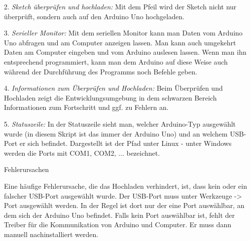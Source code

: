 2. \emph{Sketch überprüfen und hochladen:} Mit dem Pfeil wird der Sketch nicht nur überprüft, sondern auch auf den Arduino Uno hochgeladen.

3. \emph{Serieller Monitor:} Mit dem seriellen Monitor kann man Daten vom Arduino Uno abfragen und am Computer anzeigen lassen. Man kann auch umgekehrt Daten am Computer eingeben und vom Arduino auslesen lassen. Wenn man ihn entsprechend programmiert, kann man dem Arduino auf diese Weise auch während der Durchführung des Programms noch Befehle geben.

4. \emph{Informationen zum Überprüfen und Hochladen:} Beim Überprüfen und Hochladen zeigt die Entwicklungsumgebung in dem schwarzen Bereich Informationen zum Fortschritt und ggf. zu Fehlern an.

5. \emph{Statuszeile:} In der Statuszeile sieht man, welcher Arduino-Typ ausgewählt wurde (in diesem Skript ist das immer der Arduino Uno) und an welchem USB-Port er sich befindet. Dargestellt ist der Pfad unter Linux - unter Windows werden die Ports mit COM1, COM2, ... bezeichnet.

\begin{zsfg}{Fehlerursachen}
	
	Eine häufige Fehlerursache, die das Hochladen verhindert, ist, dass kein oder ein falscher USB-Port ausgewählt wurde. Der USB-Port muss unter Werkzeuge -> Port ausgewählt werden. In der Regel ist dort nur der eine Port auswählbar, an dem sich der Arduino Uno befindet. Falls kein Port auswählbar ist, fehlt der Treiber für die Kommunikation von Arduino und Computer. Er muss dann manuell nachinstalliert werden.
\end{zsfg}